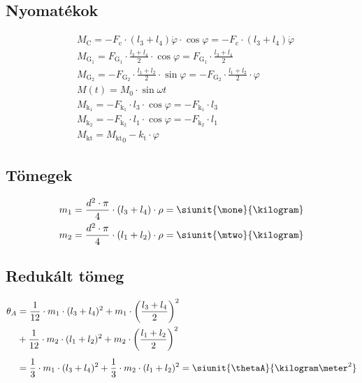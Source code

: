 \subsection{Nyomatékok}
\begin{align}
     & M_\text{C}
    = -F_\text{c} \cdot (l_3 + l_4)\dot{\varphi} \cdot \cos{\varphi}
    = -F_\text{c} \cdot (l_3 + l_4)\dot{\varphi}              \\
     & M_{{\text{G}}_1}
    = F_{\text{G}_1} \cdot \frac{l_3 + l_4}{2} \cdot \cos{\varphi}
    = F_{\text{G}_1} \cdot \frac{l_3 + l_4}{2}                \\
     & M_{{\text{G}}_2}
    = -F_{\text{G}_2} \cdot \frac{l_1 + l_2}{2} \cdot \sin{\varphi}
    = -F_{\text{G}_2} \cdot \frac{l_1 + l_2}{2} \cdot \varphi \\
     & M(t)
    = M_0 \cdot \sin{\omega t}                                \\
     & M_{\text{k}_1}
    = -F_{\text{k}_1} \cdot l_3 \cdot \cos{\varphi}
    = -F_{\text{k}_1} \cdot l_3                               \\
     & M_{\text{k}_2}
    = -F_{\text{k}_2} \cdot l_1 \cdot \cos{\varphi}
    = -F_{\text{k}_2} \cdot l_1                               \\
     & M_\text{kt}
    = {M_\text{kt}}_0 - k_\text{t} \cdot \varphi
\end{align}

\subsection{Tömegek}
\begin{align}
    m_1 & = \frac{d^2 \cdot \pi}{4} \cdot (l_3 + l_4) \cdot \rho = \siunit{\mone}{\kilogram} \\
    m_2 & = \frac{d^2 \cdot \pi}{4} \cdot (l_1 + l_2) \cdot \rho = \siunit{\mtwo}{\kilogram}
\end{align}

\subsection{Redukált tömeg}
\begin{equation}
    \begin{split}
        \theta_A &= \frac{1}{12} \cdot m_1 \cdot (l_3 + l_4)^2 + m_1 \cdot \left( \frac{l_3 + l_4}{2} \right)^2 \\&+ \frac{1}{12} \cdot m_2 \cdot (l_1 + l_2)^2 + m_2 \cdot \left( \frac{l_1 + l_2}{2} \right)^2 \\[1ex]
        &= \frac{1}{3} \cdot m_1 \cdot (l_3 + l_4)^2 + \frac{1}{3} \cdot m_2 \cdot (l_1 + l_2)^2 = \siunit{\thetaA}{\kilogram\meter^2}
    \end{split}
\end{equation}

